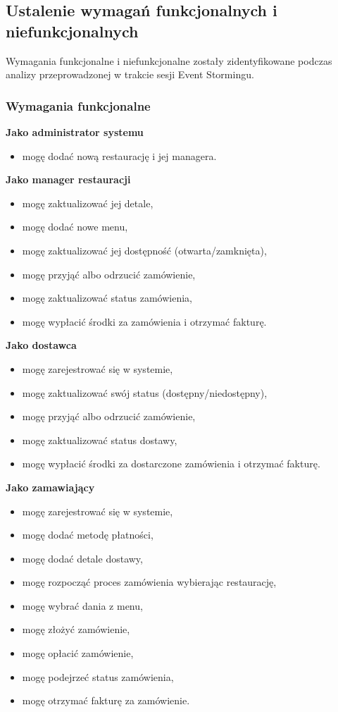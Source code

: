 \subsection{Ustalenie wymagań funkcjonalnych i niefunkcjonalnych}

Wymagania funkcjonalne i niefunkcjonalne zostały zidentyfikowane podczas analizy przeprowadzonej w trakcie sesji Event Stormingu.

\subsubsection{Wymagania funkcjonalne}

\textbf{Jako administrator systemu}
\begin{itemize}
    \item mogę dodać nową restaurację i jej managera.
\end{itemize}

\textbf{Jako manager restauracji}
\begin{itemize}
    \item mogę zaktualizować jej detale,
    \item mogę dodać nowe menu,
    \item mogę zaktualizować jej dostępność (otwarta/zamknięta),
    \item mogę przyjąć albo odrzucić zamówienie,
    \item mogę zaktualizować status zamówienia,
    \item mogę wypłacić środki za zamówienia i otrzymać fakturę.
\end{itemize}

\textbf{Jako dostawca}
\begin{itemize}
    \item mogę zarejestrować się w systemie,
    \item mogę zaktualizować swój status (dostępny/niedostępny),
    \item mogę przyjąć albo odrzucić zamówienie,
    \item mogę zaktualizować status dostawy,
    \item mogę wypłacić środki za dostarczone zamówienia i otrzymać fakturę.
\end{itemize}

\textbf{Jako zamawiający}
\begin{itemize}
    \item mogę zarejestrować się w systemie,
    \item mogę dodać metodę płatności,
    \item mogę dodać detale dostawy,
    \item mogę rozpocząć proces zamówienia wybierając restaurację,
    \item mogę wybrać dania z menu,
    \item mogę złożyć zamówienie,
    \item mogę opłacić zamówienie,
    \item mogę podejrzeć status zamówienia,
    \item mogę otrzymać fakturę za zamówienie.
\end{itemize}


